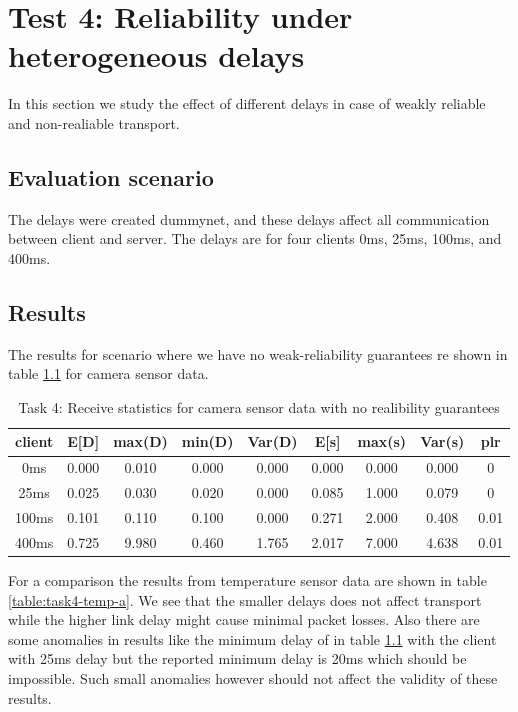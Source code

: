 \chapter{Test 4: Reliability under heterogeneous delays}
In this section we study the effect of different delays in case of
weakly reliable and non-realiable transport.

\section{Evaluation scenario}
The delays were created dummynet, and these delays affect all communication
between client and server. The delays are for four clients 0ms, 25ms, 100ms, and
400ms.


\section{Results}
The results for scenario where we have no weak-reliability guarantees 
re shown in table \ref{table:task4-camera-a} for camera sensor data.
\begin{table}
\centering
\begin{tabular}{|c|c|c|c|c|c|c|c|c|}
\hline
client & E[D] & max(D) & min(D) & Var(D) & E[s] & max(s) & Var(s) & plr\\
\hline
0ms & 0.000 & 0.010 & 0.000 & 0.000 & 0.000 & 0.000 & 0.000 & 0\\
\hline
25ms & 0.025 & 0.030 & 0.020 & 0.000 & 0.085 & 1.000  & 0.079 & 0\\
\hline
100ms & 0.101 & 0.110 & 0.100 & 0.000 & 0.271 & 2.000  & 0.408 & 0.01\\
\hline
400ms & 0.725 & 9.980 & 0.460 & 1.765 & 2.017 & 7.000  & 4.638 & 0.01\\
\hline
\end{tabular}
\caption{Task 4: Receive statistics for camera sensor data with no realibility guarantees}
\label{table:task4-camera-a}
\end{table}

For a comparison the results from temperature sensor data are shown in table
\ref{table:task4-temp-a}. We see that the smaller delays does not affect
transport while the higher link delay might cause minimal packet losses. 
Also there are some anomalies in results like the minimum
delay of in table \ref{table:task4-camera-a} with the client with 25ms delay but
the reported minimum delay is 20ms which should be impossible. Such small
anomalies however should not affect the validity of these results.


